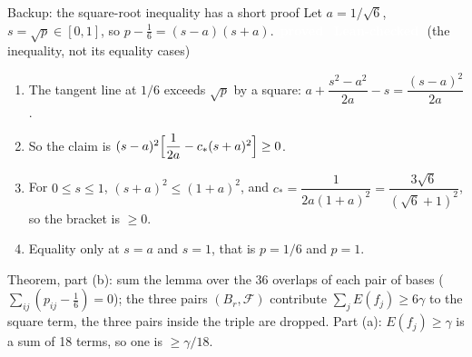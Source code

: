 \documentclass[aspectratio=169,11pt,t]{beamer}
\newcommand{\tg}[2]{{\setlength{\fboxsep}{1.2pt}\colorbox{#1}{\textcolor{white}{\sffamily\bfseries\footnotesize\,#2\,}}}}
\newcommand{\Tproved}{\tg{cProved}{proved}}
\newcommand{\Tleanh}{\tg{cLeanH}{Lean-checked}}
\newcommand{\cstar}{c_\ast}
\begin{document}
\begin{frame}{Backup: the square-root inequality has a short proof}
\small
Let $a=1/\sqrt6$, $s=\sqrt p\in[0,1]$, so $p-\tfrac16=(s-a)(s+a)$. \Tproved\ \Tleanh\ (the inequality, not its equality cases)
\vspace{0.1cm}
\begin{enumerate}\setlength\itemsep{3pt}
\item The tangent line at $1/6$ exceeds $\sqrt p$ by a square: $a+\dfrac{s^2-a^2}{2a}-s=\dfrac{(s-a)^2}{2a}$.
\item So the claim is $(s-a)^2\Bigl[\dfrac1{2a}-\cstar(s+a)^2\Bigr]\ge0$.
\item For $0\le s\le1$, $(s+a)^2\le(1+a)^2$, and $\cstar=\dfrac1{2a(1+a)^2}=\dfrac{3\sqrt6}{(\sqrt6+1)^2}$, so the bracket is $\ge0$.
\item Equality only at $s=a$ and $s=1$, that is $p=1/6$ and $p=1$.
\end{enumerate}
\footnotesize Theorem, part (b): sum the lemma over the 36 overlaps of each pair of bases ($\sum_{ij}(p_{ij}-\tfrac16)=0$); the three pairs $(B_r,\mathcal F)$ contribute $\sum_jE(f_j)\ge6\gamma$ to the square term, the three pairs inside the triple are dropped. Part (a): $E(f_j)\ge\gamma$ is a sum of 18 terms, so one is $\ge\gamma/18$.
\end{frame}
\end{document}
